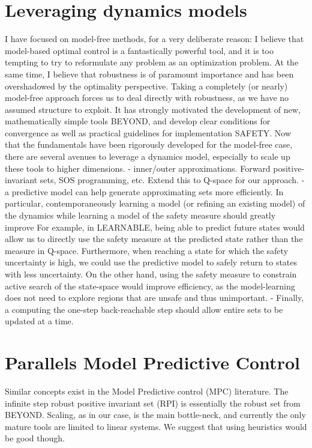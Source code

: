 \section{Leveraging dynamics models}
I have focused on model-free methods, for a very deliberate reason: I believe that model-based optimal control is a fantastically powerful tool, and it is too tempting to try to reformulate any problem as an optimization problem.
At the same time, I believe that robustness is of paramount importance and has been overshadowed by the optimality perspective.
Taking a completely (or nearly) model-free approach forces us to deal directly with robustness, as we have no assumed structure to exploit.
It has strongly motivated the development of new, mathematically simple tools BEYOND, and develop clear conditions for convergence as well as practical guidelines for implementation SAFETY. 
Now that the fundamentals have been rigorously developed for the model-free case, there are several avenues to leverage a dynamics model, especially to scale up these tools to higher dimensions.
- inner/outer approximations. Forward positive-invariant sets, SOS programming, etc. Extend this to Q-space for our approach.
- a predictive model can help generate approximating sets more efficiently. In particular, contemporaneously learning a model (or refining an existing model) of the dynamics while learning a model of the safety measure should greatly improve  For example, in LEARNABLE, being able to predict future states would allow us to directly use the safety measure at the predicted state rather than the measure in Q-space. Furthermore, when reaching a state for which the safety uncertainty is high, we could use the predictive model to safely return to states with less uncertainty. On the other hand, using the safety measure to constrain active search of the state-space would improve efficiency, as the model-learning does not need to explore regions that are unsafe and thus unimportant.
- Finally, a computing the one-step back-reachable step should allow entire sets to be updated at a time.

\section{Parallels Model Predictive Control}
Similar concepts exist in the Model Predictive control (MPC) literature. The infinite step robust positive invariant set (RPI) is essentially the robust set from BEYOND. Scaling, as in our case, is the main bottle-neck, and currently the only mature tools are limited to linear systems.
We suggest that using heuristics would be good though.
